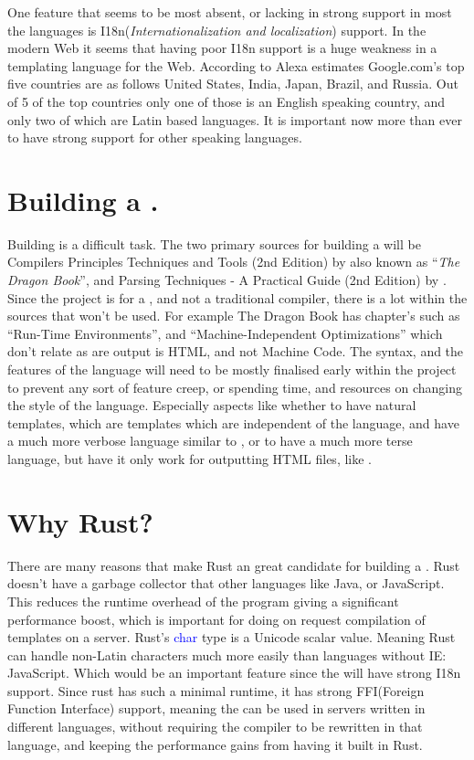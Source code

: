 One feature that seems to be most absent, or lacking in strong support in most the languages is I18n(\textit{Internationalization and localization}) support. In the modern Web it seems that having poor I18n support is a huge weakness in a templating language for the Web. According to Alexa estimates Google.com's top five countries are as follows United States, India, Japan, Brazil, and Russia. Out of 5 of the top countries only one of those is an English speaking country, and only two of which are Latin based languages. It is important now more than ever to have strong support for other speaking languages.
\newpage
\section{Building a \compiler{}.}
Building \compiler{} is a difficult task. The two primary sources for building a \compiler{} will be Compilers Principles Techniques and Tools (2nd Edition) by \parencite{DragonBook} also known as ``\textit{The Dragon Book}'', and Parsing Techniques - A Practical Guide (2nd Edition) by \parencite{ParseTech}. Since the project is for a \compiler{}, and not a traditional compiler, there is a lot within the sources that won't be used. For example The Dragon Book has chapter's such as ``Run-Time Environments'', and ``Machine-Independent Optimizations'' which don't relate as are output is HTML, and not Machine Code. The syntax, and the features of the language will need to be mostly finalised early within the project to prevent any sort of feature creep, or spending time, and resources on changing the style of the language. Especially aspects like whether to have natural templates, which are templates which are independent of the language, and have a much more verbose language similar to \parencite{Mustache}, or to have a much more terse language, but have it only work for outputting HTML files, like \parencite{Jade}. 

\section{Why Rust?}
There are many reasons that make Rust an great candidate for building a \compiler{}. Rust doesn't have a garbage collector that other languages like Java, or JavaScript. This reduces the runtime overhead of the program giving a significant performance boost, which is important for doing on request compilation of templates on a server. Rust's \textcolor{blue}{char} type is a Unicode scalar value. Meaning Rust can handle non-Latin characters much more easily than languages without IE: JavaScript. Which would be an important feature since the \languageName{} will have strong I18n support. Since rust has such a minimal runtime, it has strong FFI(Foreign Function Interface) support, meaning the \compiler{} can be used in servers written in different languages, without requiring the compiler to be rewritten in that language, and keeping the performance gains from having it built in Rust.